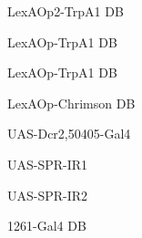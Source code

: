 \documentclass[17pt]{extarticle}
\begin{document}
\footnotesize
\vspace*{\fill}
\newpage{}
\vspace*{\fill}\begin{small}
LexAOp2-TrpA1 DB \\[0.5em]
\end{small}
\footnotesize
\vspace*{\fill}
\newpage{}
\vspace*{\fill}\begin{normalsize}
LexAOp-TrpA1 DB \\[0.5em]
\end{normalsize}
\footnotesize
\vspace*{\fill}
\newpage{}
\vspace*{\fill}\begin{normalsize}
LexAOp-TrpA1 DB \\[0.5em]
\end{normalsize}
\footnotesize
\vspace*{\fill}
\newpage{}
\vspace*{\fill}\begin{small}
LexAOp-Chrimson DB \\[0.5em]
\end{small}
\footnotesize
\vspace*{\fill}
\newpage{}
\vspace*{\fill}\begin{small}
UAS-Dcr2,50405-Gal4 \\[0.5em]
\end{small}
\footnotesize
\vspace*{\fill}
\newpage{}
\vspace*{\fill}\begin{normalsize}
UAS-SPR-IR1 \\[0.5em]
\end{normalsize}
\footnotesize
\vspace*{\fill}
\newpage{}
\vspace*{\fill}\begin{normalsize}
UAS-SPR-IR2 \\[0.5em]
\end{normalsize}
\footnotesize
\vspace*{\fill}
\newpage{}
\vspace*{\fill}\begin{normalsize}
1261-Gal4 DB \\[0.5em]
\end{normalsize}
\footnotesize
\vspace*{\fill}
\end{document}
